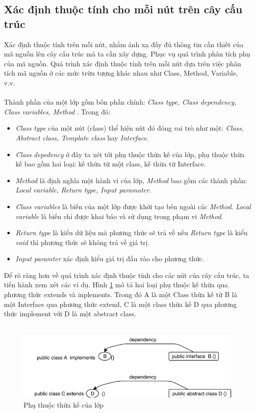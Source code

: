 \documentclass[12pt]{report}
\begin{document}
\subsection{Xác định thuộc tính cho mỗi nút trên cây cấu trúc}
Xác định thuộc tính trên mỗi nút, nhằm ánh xạ đầy đủ thông tin cần thiết của mã nguồn lên cây cấu trúc mà ta cần xây dựng. Phục vụ quá trình phân tích phụ của mã nguồn. Quá trình xác định thuộc tính trên mỗi nút dựa trên việc phân tích mã nguồn ở các mức trừu tượng khác nhau như Class, Method, Variable, v.v.\\\\
Thành phần của một lớp gồm bốn phần chính: \textit{Class type, Class dependency, Class variables, Method }. Trong đó:
\begin{itemize}
	\item \textit{Class type} của một nút (class) thể hiện nút đó đóng vai trò như một:\textit{ Class, Abstract class, Template class} hay \textit{Interface}.
	\item \textit{Class depedency} ở đây  ta xét tới phụ thuộc thừa kế của lớp, phụ thuộc thừa kế bao gồm hai loại: kế thừa từ một class, kế thừa từ Interface.
	\item \textit{Method} là định nghĩa một hành vi của lớp, \textit{Method} bao gồm các thành phần: \textit{Local variable, Return type, Input paramater}.
	\item  \textit{Class variables} là biến của một lớp được khởi tạo bên ngoài các \textit{Method}. \textit{Local variable} là biến chỉ được khai báo và sử dụng trong phạm vi \textit{Method}.  
	\item \textit{Return type} là kiểu dữ liệu mà phương thức sẽ trả về nếu \textit{Return type} là kiểu \textit{void} thì phương thức sẽ không trả về giá trị.
	\item \textit{Input paramter} xác định kiểu giá trị đầu vào cho phương thức.
\end{itemize}
Để rõ ràng hơn về quá trình xác định thuộc tính cho các nút của cây cấu trúc, ta tiến hành xem xét các ví dụ.
Hình \ref{fig:dependecy_extend} mô tả hai loại phụ thuộc kế thừa qua phương thức extends và inplements. Trong đó A là một Class thừa kế từ B là một Interface qua phương thức extend, C là một class thừa kế D qua phương thức implement với D là một abstract class.\\\\
\begin{figure}[!htbp]
	\centering
	\vspace{-1cm}
	\includegraphics[scale=0.45]{images/class_dependency}
	\caption{Phụ thuộc thừa kế của lớp}
	\label{fig:dependecy_extend}
\end{figure}
\end{document}
